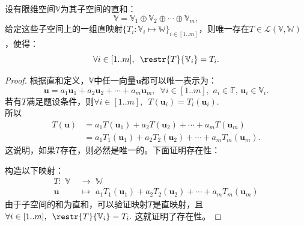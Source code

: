 \documentclass[12pt,UTF8]{ctexbook}
\begin{document}
\begin{pp}\label{pp:3_1}
    设有限维空间$\mathbb{V}$为其子空间的直和：
    $$ \mathbb{V} = \mathbb{V}_1 \oplus \mathbb{V}_2 \oplus \cdots \oplus \mathbb{V}_m, $$
    给定这些子空间上的一组直映射$\{T_i:\mathbb{V}_i\mapsto\mathbb{W}\}_{i\in\left[1..m\right]}$，则唯一存在$T\in\mathcal{L}(\mathbb{V},\mathbb{W})$，使得：
    $$ \forall i\in[1..m],\,\,\, \restr{T}{\mathbb{V}_i} = T_i.$$

\end{pp}
\begin{proof} %
    根据直和定义，$\mathbb{V}$中任一向量$\mathbf{u}$都可以唯一表示为：
    $$ \mathbf{u} = a_1\mathbf{u}_1 + a_2\mathbf{u}_2 + \cdots + a_m\mathbf{u}_m,\,\,\, \forall i\in[1..m],\,\,a_i\in\mathbb{F},\,\mathbf{u}_i\in\mathbb{V}_i.$$
    若有$T$满足题设条件，则$\forall i \in[1..m],\,\,\,T(\mathbf{u}_i) = T_i(\mathbf{u}_i)$.\\
    所以
    \begin{align*}
        T(\mathbf{u}) &= a_1T(\mathbf{u}_1) + a_2T(\mathbf{u}_2) + \cdots + a_mT(\mathbf{u}_m)  \\
                      &= a_1T_1(\mathbf{u}_1) + a_2T_2(\mathbf{u}_2) + \cdots + a_mT_m(\mathbf{u}_m). 
    \end{align*}
    这说明，如果$T$存在，则必然是唯一的。下面证明存在性：

    构造以下映射：
    \begin{align*}
        T: \,\, \mathbb{V} \,\,& \to \,\,\mathbb{W}  \\
        \mathbf{u} \,\,& \mapsto \,\, a_1T_1(\mathbf{u}_1) + a_2T_2(\mathbf{u}_2) + \cdots + a_mT_m(\mathbf{u}_m) 
    \end{align*} 
    由于子空间的和为直和，可以验证映射$T$是直映射，且$\forall i\in[1..m],\,\,\, \restr{T}{\mathbb{V}_i} = T_i.$ 
    这就证明了存在性。

\end{proof}
\end{document}
